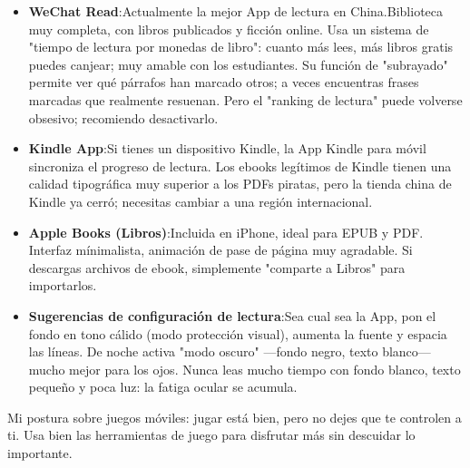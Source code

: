\begin{itemize}
  \item \textbf{WeChat Read}:Actualmente la mejor App de lectura en China.Biblioteca muy completa, con libros publicados y ficción online. Usa un sistema de "tiempo de lectura por monedas de libro": cuanto más lees, más libros gratis puedes canjear; muy amable con los estudiantes. Su función de "subrayado" permite ver qué párrafos han marcado otros; a veces encuentras frases marcadas que realmente resuenan. Pero el "ranking de lectura" puede volverse obsesivo; recomiendo desactivarlo.
  \item \textbf{Kindle App}:Si tienes un dispositivo Kindle, la App Kindle para móvil sincroniza el progreso de lectura. Los ebooks legítimos de Kindle tienen una calidad tipográfica muy superior a los PDFs piratas, pero la tienda china de Kindle ya cerró; necesitas cambiar a una región internacional.
  \item \textbf{Apple Books (Libros)}:Incluida en iPhone, ideal para EPUB y PDF. Interfaz mínimalista, animación de pase de página muy agradable. Si descargas archivos de ebook, simplemente "comparte a Libros" para importarlos.
  \item \textbf{Sugerencias de configuración de lectura}:Sea cual sea la App, pon el fondo en tono cálido (modo protección visual), aumenta la fuente y espacia las líneas. De noche activa "modo oscuro" —fondo negro, texto blanco— mucho mejor para los ojos. Nunca leas mucho tiempo con fondo blanco, texto pequeño y poca luz: la fatiga ocular se acumula.
\end{itemize}


Mi postura sobre juegos móviles: jugar está bien, pero no dejes que te controlen a ti. Usa bien las herramientas de juego para disfrutar más sin descuidar lo importante.

